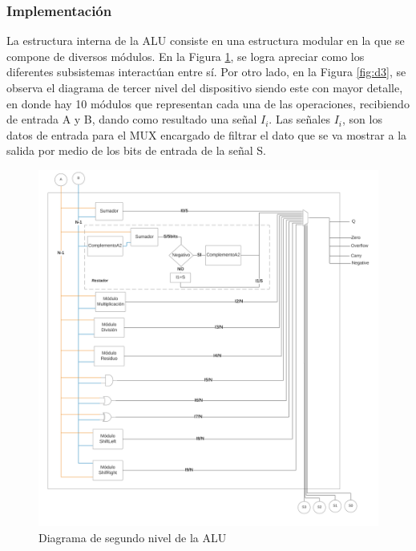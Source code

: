 \documentclass[journal]{IEEEtran}
\begin{document}
	\subsubsection{Implementación}
	
	La estructura interna de la ALU consiste en una estructura modular en la que se compone de diversos módulos. En la Figura \ref{fig:d2}, se logra apreciar como los diferentes subsistemas interactúan entre sí. Por otro lado, en la Figura \ref{fig:d3}, se observa el diagrama de tercer nivel del dispositivo siendo este con mayor detalle, en donde hay 10 módulos que representan cada una de las operaciones, recibiendo de entrada A y B, dando como resultado una señal $I_i$. Las señales $I_i$, son los datos de entrada para el MUX encargado de filtrar el dato que se va mostrar a la salida por medio de los bits de entrada de la señal S.
	\begin{figure}[hbtp]
		\centering
		\includegraphics[scale = 0.04]{img/segundonivel.png}
		\caption{Diagrama de segundo nivel de la ALU }
		\label{fig:d2}
	\end{figure}
	
\end{document}
